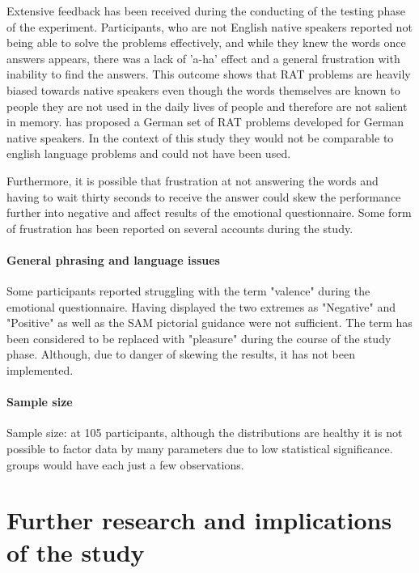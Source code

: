 	Extensive feedback has been received during the conducting of the testing phase of the experiment. Participants, who are not English native speakers reported not being able to solve the problems effectively, and while they knew the words once answers appears, there was a lack of 'a-ha' effect and a general frustration with inability to find the answers. This outcome shows that RAT problems are heavily biased towards native speakers even though the words themselves are known to people they are not used in the daily lives of people and therefore are not salient in memory. \cite{Landmann2014} has proposed a German set of RAT problems developed for German native speakers. In the context of this study they would not be comparable to english language problems and could not have been used.
	
	Furthermore, it is possible that frustration at not answering the words and having to wait thirty seconds to receive the answer could skew the performance further into negative and affect results of the emotional questionnaire. Some form of frustration has been reported on several accounts during the study.
	

	\paragraph{General phrasing and language issues}
	
	Some participants reported struggling with the term "valence" during the emotional questionnaire. Having displayed the two extremes as "Negative" and "Positive" as well as the SAM pictorial guidance were not sufficient. The term has been considered to be replaced with "pleasure" during the course of the study phase. Although, due to danger of skewing the results, it has not been implemented.
		
	 \paragraph{Sample size}
	Sample size: at 105 participants, although the distributions are healthy it is not possible to factor data by many parameters due to low statistical significance. groups would have each just a few observations.
	
	

\section{Further research and implications of the study} \label{sec:further-research}

